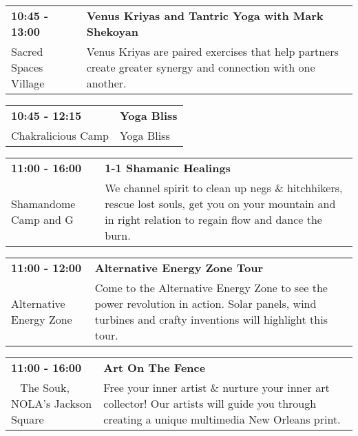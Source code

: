 \begin{tabular}{ p{1in} p{2.2in} }
    \textbf{10:45 - 13:00} & \textbf{Venus Kriyas and Tantric Yoga with Mark Shekoyan} \\
    Sacred Spaces Village \newline  & Venus Kriyas are paired exercises that help partners create greater synergy and connection with one another. \\
    \hline 
\end{tabular}
    
\begin{tabular}{ p{1in} p{2.2in} }
    \textbf{10:45 - 12:15} & \textbf{Yoga Bliss} \\
    Chakralicious Camp \newline  & Yoga Bliss \\
    \hline 
\end{tabular}
    
\begin{tabular}{ p{1in} p{2.2in} }
    \textbf{11:00 - 16:00} & \textbf{1-1 Shamanic Healings} \\
    Shamandome Camp \newline 615 and G & We channel spirit to clean up negs \& hitchhikers, rescue lost souls, get you on your mountain and in right relation to regain flow and dance the burn. \\
    \hline 
\end{tabular}
    
\begin{tabular}{ p{1in} p{2.2in} }
    \textbf{11:00 - 12:00} & \textbf{Alternative Energy Zone Tour} \\
    Alternative Energy Zone \newline  & Come to the Alternative Energy Zone to see the power revolution in action. Solar panels, wind turbines and crafty inventions will highlight this tour. \\
    \hline 
\end{tabular}
    
\begin{tabular}{ p{1in} p{2.2in} }
    \textbf{11:00 - 16:00} & \textbf{Art On The Fence} \\
    ~ \newline The Souk, NOLA's Jackson Square  & Free your inner artist \& nurture your inner art collector! Our artists will guide you through creating a unique multimedia New Orleans print. \\
    \hline 
\end{tabular}
    
